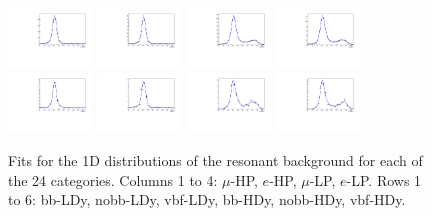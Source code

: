 \begin{figure}[htbp]
  \includegraphics[width=0.2\textwidth]{fig/2Dfit/LNuJJ_res_MJJ_mu_HP_nobb_HDy.pdf}
  \includegraphics[width=0.2\textwidth]{fig/2Dfit/LNuJJ_res_MJJ_e_HP_nobb_HDy.pdf}
  \includegraphics[width=0.2\textwidth]{fig/2Dfit/LNuJJ_res_MJJ_mu_LP_nobb_HDy.pdf}
  \includegraphics[width=0.2\textwidth]{fig/2Dfit/LNuJJ_res_MJJ_e_LP_nobb_HDy.pdf}\\
  \includegraphics[width=0.2\textwidth]{fig/2Dfit/LNuJJ_res_MJJ_mu_HP_vbf_HDy.pdf}
  \includegraphics[width=0.2\textwidth]{fig/2Dfit/LNuJJ_res_MJJ_e_HP_vbf_HDy.pdf}
  \includegraphics[width=0.2\textwidth]{fig/2Dfit/LNuJJ_res_MJJ_mu_LP_vbf_HDy.pdf}
  \includegraphics[width=0.2\textwidth]{fig/2Dfit/LNuJJ_res_MJJ_e_LP_vbf_HDy.pdf}\\
  \caption{
    Fits for the 1D \MJ distributions of the resonant background for each of the 24 categories.
    Columns 1 to 4: $\mu$-HP, $e$-HP, $\mu$-LP, $e$-LP.
    Rows 1 to 6: bb-LDy, nobb-LDy, vbf-LDy, bb-HDy, nobb-HDy, vbf-HDy.
  }
  \label{fig:fits_res_MJJ_Run2}
\end{figure}

